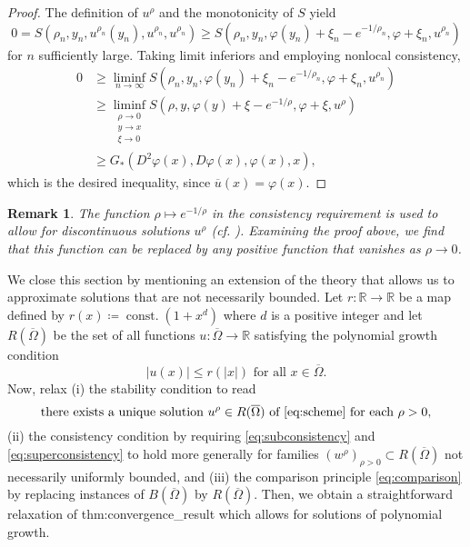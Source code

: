 \documentclass[12pt]{article}
\newcounter{dummy}
\newtheorem{rem}[dummy]{Remark}
\begin{document}
\begin{proof}
The definition of $u^{\rho}$ and the monotonicity of $S$ yield
\[
0=S(\rho_{n},y_{n},u^{\rho_{n}}(y_{n}),u^{\rho_{n}},u^{\rho_{n}}){\geqslant} S(\rho_{n},y_{n},\varphi(y_{n})+\xi_{n}-e^{-1/\rho_{n}},\varphi+\xi_{n},u^{\rho_{n}})
\]
for $n$ sufficiently large. Taking limit inferiors and employing
nonlocal consistency,
\begin{align*}
0 & {\geqslant}\liminf_{n\rightarrow\infty}S(\rho_{n},y_{n},\varphi(y_{n})+\xi_{n}-e^{-1/\rho_{n}},\varphi+\xi_{n},u^{\rho_{n}})\\
 & {\geqslant}\liminf_{\substack{\rho\rightarrow0\\
y\rightarrow x\\
\xi\rightarrow0
}
}S(\rho,y,\varphi(y)+\xi-e^{-1/\rho},\varphi+\xi,u^{\rho})\\
 & {\geqslant} G_{*}(D^{2}\varphi(x),D\varphi(x),\varphi(x),x),
\end{align*}
which is the desired inequality, since $\overline{u}(x)=\varphi(x)$.
\end{proof}
\begin{rem}The function $\rho\mapsto e^{-1/\rho}$ in the consistency
requirement is used to allow for discontinuous solutions $u^{\rho}$
(cf. \cite{253954}). Examining the proof above, we find that this
function can be replaced by any positive function that vanishes as
$\rho\rightarrow0$.\end{rem}

We close this section by mentioning an extension of the theory that
allows us to approximate solutions that are not necessarily bounded.
Let $r:\mathbb{R}\rightarrow\mathbb{R}$ be a map defined by $r(x)\coloneqq{\operatorname{const.}}(1+x^{d})$
where $d$ is a positive integer and let $R(\overline{\Omega})$ be
the set of all functions $u:\overline{\Omega}\rightarrow\mathbb{R}$
satisfying the polynomial growth condition
\[
\left|u(x)\right|{\leqslant} r(|x|)\text{ for all }x\in\overline{\Omega}.
\]
Now, relax (i) the stability condition to read
\[
\text{there exists a unique solution }u^{\rho}\in R(\overline{\Omega})\text{ of }\eqref{eq:scheme}\text{ for each }\rho>0,
\]
(ii) the consistency condition by requiring \eqref{eq:subconsistency}
and \eqref{eq:superconsistency} to hold more generally for families
$(w^{\rho})_{\rho>0}\subset R(\overline{\Omega})$ not necessarily
uniformly bounded, and (iii) the comparison principle \eqref{eq:comparison}
by replacing instances of $B(\overline{\Omega})$ by $R(\overline{\Omega})$.
Then, we obtain a straightforward relaxation of {\prettyref}{thm:convergence_result}
which allows for solutions of polynomial growth.
\end{document}
